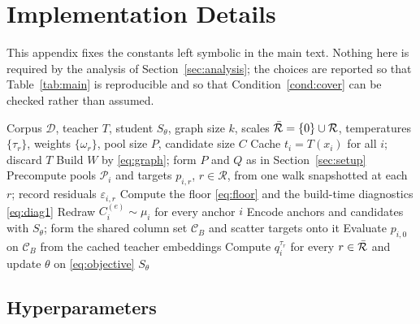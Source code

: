 \section{Implementation Details}
\label{app:impl}

This appendix fixes the constants left symbolic in the main text. Nothing here is required
by the analysis of Section~\ref{sec:analysis}; the choices are reported so that
Table~\ref{tab:main} is reproducible and so that Condition~\ref{cond:cover} can be checked
rather than assumed.

\begin{algorithm}[h]
\caption{\method training}
\label{alg:method}
\begin{algorithmic}[1]
\REQUIRE Corpus $\mathcal{D}$, teacher $T$, student $S_\theta$, graph size $k$, scales
$\bar{\mathcal{R}}=\{0\}\cup\mathcal{R}$, temperatures $\{\tau_r\}$, weights $\{\omega_r\}$, pool size
$P$, candidate size $C$
\STATE Cache $t_i = T(x_i)$ for all $i$; discard $T$
\STATE Build $W$ by \eqref{eq:graph}; form $P$ and $Q$ as in Section~\ref{sec:setup}
\STATE Precompute pools $\mathcal{P}_i$ and targets $p_{i,r}$, $r\in\mathcal{R}$, from one walk snapshotted at each $r$; record residuals $\varepsilon_{i,r}$
\STATE Compute the floor \eqref{eq:floor} and the build-time diagnostics \eqref{eq:diag1}
  \STATE Redraw $C_i^{(e)}\sim\mu_i$ for every anchor $i$ 
    \STATE Encode anchors and candidates with $S_\theta$; form the shared column set $\mathcal{C}_B$ and scatter targets onto it
    \STATE Evaluate $p_{i,0}$ on $\mathcal{C}_B$ from the cached teacher embeddings
    \STATE Compute $q_i^{\tau_r}$ for every $r\in\bar{\mathcal{R}}$ and update $\theta$ on \eqref{eq:objective}
  \ENDFOR
\ENDFOR
\RETURN $S_\theta$
\end{algorithmic}
\end{algorithm}

\subsection{Hyperparameters}

